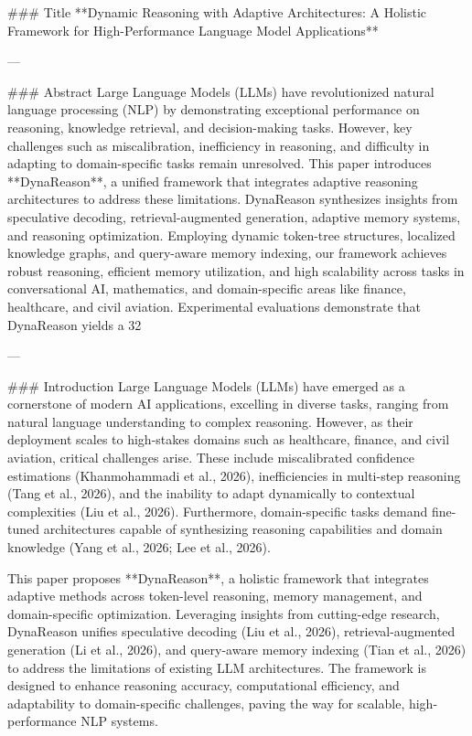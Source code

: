 ### Title  
**Dynamic Reasoning with Adaptive Architectures: A Holistic Framework for High-Performance Language Model Applications**

---

### Abstract  
Large Language Models (LLMs) have revolutionized natural language processing (NLP) by demonstrating exceptional performance on reasoning, knowledge retrieval, and decision-making tasks. However, key challenges such as miscalibration, inefficiency in reasoning, and difficulty in adapting to domain-specific tasks remain unresolved. This paper introduces **DynaReason**, a unified framework that integrates adaptive reasoning architectures to address these limitations. DynaReason synthesizes insights from speculative decoding, retrieval-augmented generation, adaptive memory systems, and reasoning optimization. Employing dynamic token-tree structures, localized knowledge graphs, and query-aware memory indexing, our framework achieves robust reasoning, efficient memory utilization, and high scalability across tasks in conversational AI, mathematics, and domain-specific areas like finance, healthcare, and civil aviation. Experimental evaluations demonstrate that DynaReason yields a 32%

---

### Introduction  
Large Language Models (LLMs) have emerged as a cornerstone of modern AI applications, excelling in diverse tasks, ranging from natural language understanding to complex reasoning. However, as their deployment scales to high-stakes domains such as healthcare, finance, and civil aviation, critical challenges arise. These include miscalibrated confidence estimations (Khanmohammadi et al., 2026), inefficiencies in multi-step reasoning (Tang et al., 2026), and the inability to adapt dynamically to contextual complexities (Liu et al., 2026). Furthermore, domain-specific tasks demand fine-tuned architectures capable of synthesizing reasoning capabilities and domain knowledge (Yang et al., 2026; Lee et al., 2026).  

This paper proposes **DynaReason**, a holistic framework that integrates adaptive methods across token-level reasoning, memory management, and domain-specific optimization. Leveraging insights from cutting-edge research, DynaReason unifies speculative decoding (Liu et al., 2026), retrieval-augmented generation (Li et al., 2026), and query-aware memory indexing (Tian et al., 2026) to address the limitations of existing LLM architectures. The framework is designed to enhance reasoning accuracy, computational efficiency, and adaptability to domain-specific challenges, paving the way for scalable, high-performance NLP systems.

